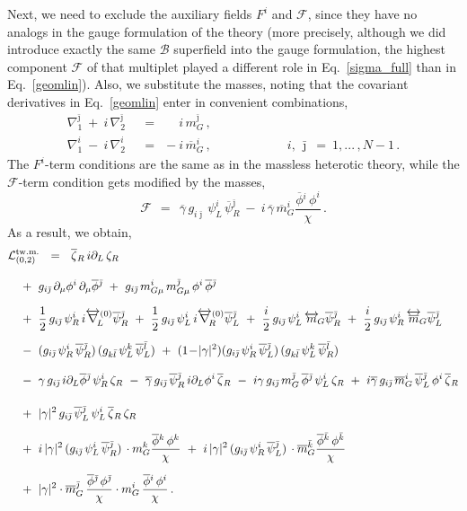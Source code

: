 \documentclass[12pt]{article}
\def\beq{\begin{equation}}
\def\eeq{\end{equation}}
\newcommand{\p}{\partial}
\newcommand{\ov}{\overline}
\newcommand{\mc}[1]{\mathcal{#1}}
\newcommand{\bzr}{\ov{\zeta}{}_R}
\newcommand{\zr}{\zeta_R}
\newcommand{\bgamma}{\ov{\gamma}}
\newcommand{\bpsi}{\ov{\psi}{}}
\newcommand{\bphi}{\ov{\phi}{}}
\newcommand{\ff}{\mc{F}}
\newcommand{\bj}{{\bar \jmath}}
\newcommand{\bk}{{\bar k}}
\newcommand{\bl}{{\bar l}}
\begin{document}
Next, we need to exclude the auxiliary fields $ F^i $ and $ \ff $, since they have no analogs
	in the gauge formulation of the theory 
	(more precisely, although we did introduce  exactly the same $\mc{B}$ superfield into the gauge formulation, 
	the highest component $\ff$ of that multiplet played a different role in Eq.~\eqref{sigma_full} than in Eq.~\eqref{geomlin}).
	Also, we substitute the masses, noting that the covariant derivatives in Eq.~\eqref{geomlin} 
	enter in convenient combinations, 
\begin{align*}
%
	\nabla_1^\bj ~+~ i\,\nabla_2^\bj & ~~=~~ \phantom{-} i\,m_G^\bj\,,    \\[2mm]
%
	\nabla_1^i ~-~ i\,\nabla_2^i     & ~~=~~ -i\,\ov{m}{}_G^i\,,
	\qquad\qquad\qquad i,\,\bj ~=~ 1,...\,,N-1\,.
\end{align*}
The $ F^i $-term conditions are the same as in the massless heterotic theory, while the $ \ff $-term condition
	gets modified by the masses,
\beq
\label{ffterm}
	\ff ~~=~~ \bgamma\, g_{i\bj}\, \psi_L^i\, \bpsi_R^\bj
	      ~-~ i\, \bgamma\, \ov{m}_G^i \frac{\bphi^i\, \phi^i}{\chi}\,.
\eeq
	As a result, we obtain, 
\begin{align}
%
\notag
	\mc{L}_{(0,2)}^\text{tw.m.} & ~~=~~ 
	\bzr\, i\p_L\, \zr \\[3mm]
%
\notag
	&\!\!\!\!\!\!\!\!\!\!\!\!
	~+~ g_{i\bj}\, \p_\mu\phi^i\, \p_\mu\bphi^\bj ~+~ g_{i\bj}\, m_{G\mu}^i\,m_{G\mu}^\bj\, \phi^i\, \bphi^\bj
	\\[2mm]
%
\notag
	&\!\!\!\!\!\!\!\!\!\!\!\!
	~+~ \frac{1}{2}\,g_{i\bj}\,\psi_R^i\,i\overleftrightarrow{\nabla}{}_{\!\!L}^{(0)} \bpsi_R^\bj 
	~+~ \frac{1}{2}\,g_{i\bj}\,\psi_L^i\,i\overleftrightarrow{\nabla}{}_{\!\!R}^{(0)} \bpsi_L^\bj 
	~+~ \frac{i}{2}\,g_{i\bj}\,\psi_L^i\, \overleftrightarrow{m}{}_{\!G} \bpsi_R^\bj
	~+~ \frac{i}{2}\,g_{i\bj}\,\psi_R^i\, \overleftrightarrow{\ov{m}}{}_{\!G} \bpsi_L^\bj
	\\[2mm]
%
\label{sgeom_phys}
	&\!\!\!\!\!\!\!\!\!\!\!\!
	~-~ (g_{i\bj}\, \psi_R^i\, \bpsi_R^\bj)\,(g_{k\bl}\, \psi_L^k\, \bpsi_L^\bl) 
	~+~ (1 \!-\!|\gamma|^2)(g_{i\bj}\, \psi_R^i\, \bpsi_L^\bj)\,(g_{k\bl}\,\psi_L^k\,\bpsi_R^\bl)
	\\[3mm]
%
\notag
	&\!\!\!\!\!\!\!\!\!\!\!\!
	~-~ \gamma\, g_{i\bj}\, i\p_L\bphi^\bj\, \psi_R^i\,\zr 
	~-~ \bgamma\, g_{i\bj}\, \bpsi_R^\bj\, i\p_L\phi^i\, \bzr
	~-~ i\gamma\, g_{i\bj}\, m_G^\bj\,\bphi^\bj\, \psi_L^i\,\zr
	~+~ i\bgamma\, g_{i\bj}\,\ov{m}{}_G^i\, \bpsi_L^\bj\, \phi^i\,\bzr
	\\[4mm]
%
\notag
	&\!\!\!\!\!\!\!\!\!\!\!\!
	~+~ |\gamma|^2\, g_{i\bj}\, \bpsi_L^\bj\, \psi_L^i\, \bzr\, \zr
	\\[2mm]
%
\notag
	&\!\!\!\!\!\!\!\!\!\!\!\!
	~+~ i\, |\gamma|^2\, (g_{i\bj}\,\psi_L^i\,\bpsi_R^\bj)\, \cdot m_G^k \frac{\bphi^k\, \phi^k}{\chi}
	~+~ i\, |\gamma|^2\, (g_{i\bj}\,\psi_R^i\,\bpsi_L^\bj)\, \cdot \ov{m}{}_G^\bk \frac{\bphi^\bk\,\phi^\bk}{\chi}
	\\[2mm]
%
\notag
	&\!\!\!\!\!\!\!\!\!\!\!\!
	~+~ |\gamma|^2 \cdot \ov{m}{}_G^\bj\,\frac{\bphi^\bj\,\phi^\bj}{\chi}
			\cdot m_G^i\, \frac{\bphi^i\, \phi^i}{\chi}\,.
\end{align}
\end{document}
